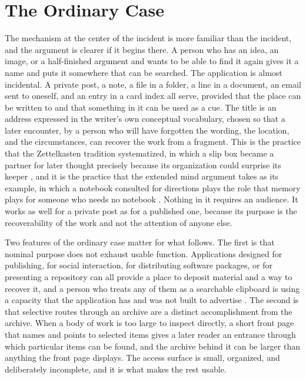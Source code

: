 \documentclass[11pt]{article}
\theoremstyle{remark}
\begin{document}
\section{The Ordinary Case}\label{sec:ordinary}

The mechanism at the center of the incident is more familiar than the incident, and the argument is clearer if it begins there. A person who has an idea, an image, or a half-finished argument and wants to be able to find it again gives it a name and puts it somewhere that can be searched. The application is almost incidental. A private post, a note, a file in a folder, a line in a document, an email sent to oneself, and an entry in a card index all serve, provided that the place can be written to and that something in it can be used as a cue. The title is an address expressed in the writer's own conceptual vocabulary, chosen so that a later encounter, by a person who will have forgotten the wording, the location, and the circumstances, can recover the work from a fragment. This is the practice that the Zettelkasten tradition systematized, in which a slip box became a partner for later thought precisely because its organization could surprise its keeper \cite{luhmann1981}, and it is the practice that the extended mind argument takes as its example, in which a notebook consulted for directions plays the role that memory plays for someone who needs no notebook \cite{clark1998}. Nothing in it requires an audience. It works as well for a private post as for a published one, because its purpose is the recoverability of the work and not the attention of anyone else.

Two features of the ordinary case matter for what follows. The first is that nominal purpose does not exhaust usable function. Applications designed for publishing, for social interaction, for distributing software packages, or for presenting a repository can all provide a place to deposit material and a way to recover it, and a person who treats any of them as a searchable clipboard is using a capacity that the application has and was not built to advertise \cite{flyxion-clipboard}. The second is that selective routes through an archive are a distinct accomplishment from the archive. When a body of work is too large to inspect directly, a short front page that names and points to selected items gives a later reader an entrance through which particular items can be found, and the archive behind it can be larger than anything the front page displays. The access surface is small, organized, and deliberately incomplete, and it is what makes the rest usable.
\end{document}
